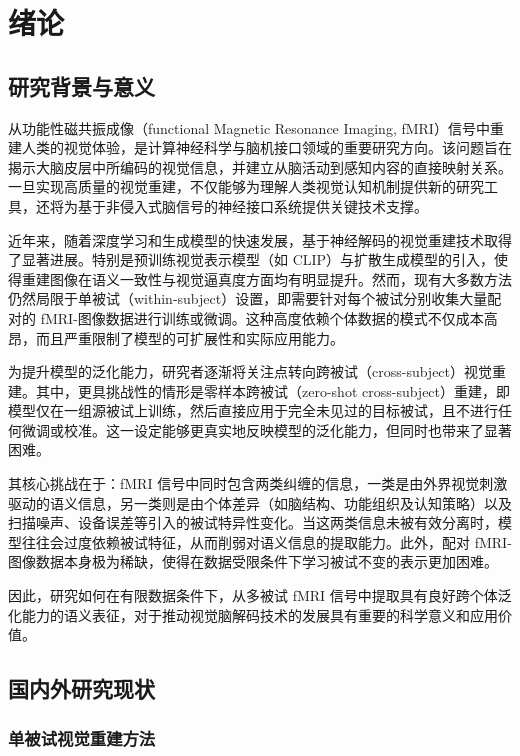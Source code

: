 
\chapter{绪论}

\section{研究背景与意义}

从功能性磁共振成像（functional Magnetic Resonance Imaging, fMRI）信号中重建人类的视觉体验，是计算神经科学与脑机接口领域的重要研究方向。该问题旨在揭示大脑皮层中所编码的视觉信息，并建立从脑活动到感知内容的直接映射关系。一旦实现高质量的视觉重建，不仅能够为理解人类视觉认知机制提供新的研究工具，还将为基于非侵入式脑信号的神经接口系统提供关键技术支撑。

近年来，随着深度学习和生成模型的快速发展，基于神经解码的视觉重建技术取得了显著进展。特别是预训练视觉表示模型（如 CLIP）与扩散生成模型的引入，使得重建图像在语义一致性与视觉逼真度方面均有明显提升。然而，现有大多数方法仍然局限于单被试（within-subject）设置，即需要针对每个被试分别收集大量配对的 fMRI-图像数据进行训练或微调。这种高度依赖个体数据的模式不仅成本高昂，而且严重限制了模型的可扩展性和实际应用能力。

为提升模型的泛化能力，研究者逐渐将关注点转向跨被试（cross-subject）视觉重建。其中，更具挑战性的情形是零样本跨被试（zero-shot cross-subject）重建，即模型仅在一组源被试上训练，然后直接应用于完全未见过的目标被试，且不进行任何微调或校准。这一设定能够更真实地反映模型的泛化能力，但同时也带来了显著困难。

其核心挑战在于：fMRI 信号中同时包含两类纠缠的信息，一类是由外界视觉刺激驱动的语义信息，另一类则是由个体差异（如脑结构、功能组织及认知策略）以及扫描噪声、设备误差等引入的被试特异性变化。当这两类信息未被有效分离时，模型往往会过度依赖被试特征，从而削弱对语义信息的提取能力。此外，配对 fMRI-图像数据本身极为稀缺，使得在数据受限条件下学习被试不变的表示更加困难。

因此，研究如何在有限数据条件下，从多被试 fMRI 信号中提取具有良好跨个体泛化能力的语义表征，对于推动视觉脑解码技术的发展具有重要的科学意义和应用价值。

\section{国内外研究现状}

\subsection{单被试视觉重建方法}

